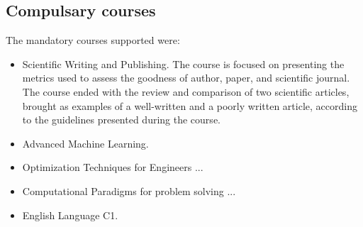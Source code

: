 \subsection{Compulsary courses}
The mandatory courses supported were:
\begin{itemize}
    \item Scientific Writing and Publishing. The course is focused on presenting the metrics used to assess the goodness of author, paper, and scientific journal. The course ended with the review and comparison of two scientific articles, brought as examples of a well-written and a poorly written article, according to the guidelines presented during the course. 
    \item Advanced Machine Learning.
    \item Optimization Techniques for Engineers ...
    \item Computational Paradigms for problem solving ...
    \item English Language C1.
\end{itemize}